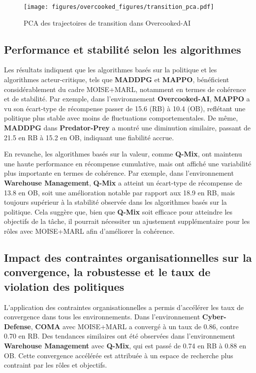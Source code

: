 \documentclass[francais,ROIA,Unicode,manuscript]{cedram}
\begin{document}
\begin{figure}[h!]
    \centering
    \texttt{[image: figures/overcooked\_figures/transition\_pca.pdf]}
    \caption{PCA des trajectoires de transition dans Overcooked-AI}
    \label{fig:overcooked_pca}
\end{figure}


\subsection{Performance et stabilité selon les algorithmes}

Les résultats indiquent que les algorithmes basés sur la politique et les algorithmes acteur-critique, tels que \textbf{MADDPG} et \textbf{MAPPO}, bénéficient considérablement du cadre MOISE+MARL, notamment en termes de cohérence et de stabilité. Par exemple, dans l'environnement \textbf{Overcooked-AI}, \textbf{MAPPO} a vu son écart-type de récompense passer de 15.6 (RB) à 10.4 (OB), reflétant une politique plus stable avec moins de fluctuations comportementales. De même, \textbf{MADDPG} dans \textbf{Predator-Prey} a montré une diminution similaire, passant de 21.5 en RB à 15.2 en OB, indiquant une fiabilité accrue.

En revanche, les algorithmes basés sur la valeur, comme \textbf{Q-Mix}, ont maintenu une haute performance en récompense cumulative, mais ont affiché une variabilité plus importante en termes de cohérence. Par exemple, dans l'environnement \textbf{Warehouse Management}, \textbf{Q-Mix} a atteint un écart-type de récompense de 13.8 en OB, soit une amélioration notable par rapport aux 18.9 en RB, mais toujours supérieur à la stabilité observée dans les algorithmes basés sur la politique. Cela suggère que, bien que \textbf{Q-Mix} soit efficace pour atteindre les objectifs de la tâche, il pourrait nécessiter un ajustement supplémentaire pour les rôles avec MOISE+MARL afin d'améliorer la cohérence.

\subsection{Impact des contraintes organisationnelles sur la convergence, la robustesse et le taux de violation des politiques}

L'application des contraintes organisationnelles a permis d'accélérer les taux de convergence dans tous les environnements. Dans l'environnement \textbf{Cyber-Defense}, \textbf{COMA} avec MOISE+MARL a convergé à un taux de 0.86, contre 0.70 en RB. Des tendances similaires ont été observées dans l'environnement \textbf{Warehouse Management} avec \textbf{Q-Mix}, qui est passé de 0.74 en RB à 0.88 en OB. Cette convergence accélérée est attribuée à un espace de recherche plus contraint par les rôles et objectifs.
\end{document}
